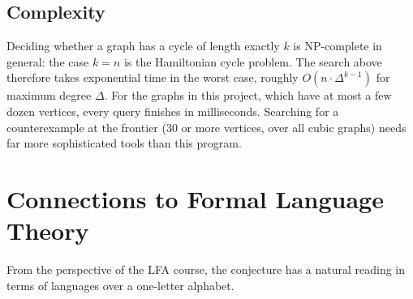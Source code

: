 \documentclass[11pt,a4paper]{article}
\theoremstyle{definition}
\begin{document}
\subsection{Complexity}

Deciding whether a graph has a cycle of length exactly $k$ is NP-complete in
general: the case $k=n$ is the Hamiltonian cycle problem. The search above
therefore takes exponential time in the worst case, roughly $O(n\cdot
\Delta^{k-1})$ for maximum degree $\Delta$. For the graphs in this project,
which have at most a few dozen vertices, every query finishes in milliseconds.
Searching for a counterexample at the frontier ($30$ or more vertices, over
all cubic graphs) needs far more sophisticated tools than this program.

\section{Connections to Formal Language Theory}

From the perspective of the LFA course, the conjecture has a natural reading
in terms of languages over a one-letter alphabet.
\end{document}
